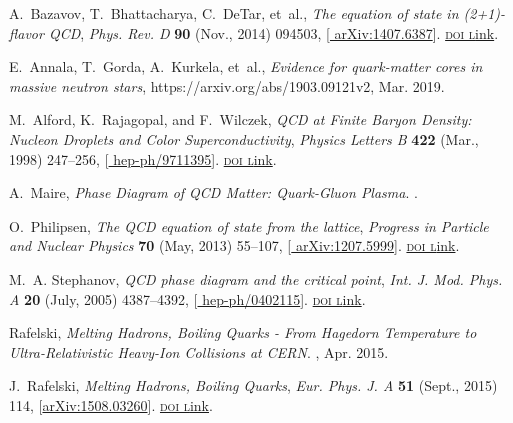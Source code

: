 \documentclass[ALICE,manyauthors]{cernphprep}
\begin{document}
\begin{thebibliography}{100}
A.~Bazavov, T.~Bhattacharya, C.~DeTar, et~al., {\it The equation of state in
  (2+1)-flavor {{QCD}}},  {\textsl{Phys. Rev. D}} {\footnotesize \bf 90} (Nov.,
  2014) 094503, [\href{https://arxiv.org/abs/1407.6387}{{\footnotesize
  arXiv:1407.6387}}].
  \href{http://dx.doi.org/10.1103/PhysRevD.90.094503}{\footnotesize
  \textrm{\textsc{doi l}ink}}.

E.~Annala, T.~Gorda, A.~Kurkela, et~al., {\it Evidence for quark-matter cores
  in massive neutron stars},  https://arxiv.org/abs/1903.09121v2, Mar. 2019.

M.~Alford, K.~Rajagopal, and F.~Wilczek, {\it {{QCD}} at {{Finite Baryon
  Density}}: {{Nucleon Droplets}} and {{Color Superconductivity}}},
  {\textsl{Physics Letters B}} {\footnotesize \bf 422} (Mar., 1998) 247--256,
  [\href{https://arxiv.org/abs/hep-ph/9711395}{{\footnotesize
  hep-ph/9711395}}].
  \href{http://dx.doi.org/10.1016/S0370-2693(98)00051-3}{\footnotesize
  \textrm{\textsc{doi l}ink}}.

A.~Maire, {\em Phase Diagram of {{QCD}} Matter: {{Quark-Gluon Plasma}}}.
.

O.~Philipsen, {\it The {{QCD}} equation of state from the lattice},
  {\textsl{Progress in Particle and Nuclear Physics}} {\footnotesize \bf 70}
  (May, 2013) 55--107, [\href{https://arxiv.org/abs/1207.5999}{{\footnotesize
  arXiv:1207.5999}}].
  \href{http://dx.doi.org/10.1016/j.ppnp.2012.09.003}{\footnotesize
  \textrm{\textsc{doi l}ink}}.

M.~A. Stephanov, {\it {{QCD}} phase diagram and the critical point},
  {\textsl{Int. J. Mod. Phys. A}} {\footnotesize \bf 20} (July, 2005)
  4387--4392, [\href{https://arxiv.org/abs/hep-ph/0402115}{{\footnotesize
  hep-ph/0402115}}].
  \href{http://dx.doi.org/10.1142/S0217751X05027965}{\footnotesize
  \textrm{\textsc{doi l}ink}}.

{Rafelski}, {\em Melting {{Hadrons}}, {{Boiling Quarks}} - {{From Hagedorn
  Temperature}} to {{Ultra-Relativistic Heavy-Ion Collisions}} at {{CERN}}}.
, Apr. 2015.

J.~Rafelski, {\it Melting {{Hadrons}}, {{Boiling Quarks}}},  {\textsl{Eur.
  Phys. J. A}} {\footnotesize \bf 51} (Sept., 2015) 114,
  [\href{https://arxiv.org/abs/1508.03260}{{\footnotesize arXiv:1508.03260}}].
  \href{http://dx.doi.org/10.1140/epja/i2015-15114-0}{\footnotesize
  \textrm{\textsc{doi l}ink}}.


\end{thebibliography}
\end{document}
